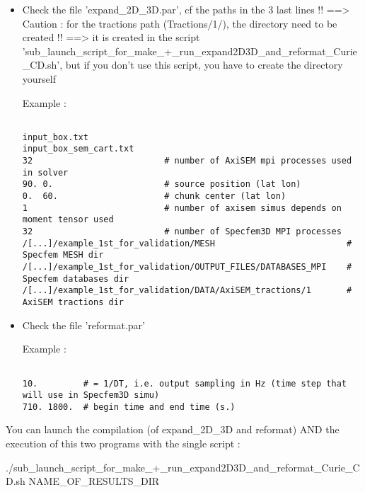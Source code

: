 \documentclass[11pt]{article}
\begin{document}
\begin{itemize}

\item[\textbullet] Check the file 'expand\_2D\_3D.par', cf the paths in the 3 last lines !! ==> Caution : for the tractions path (Tractions/1/), the directory need to be created !! ==> it is created in the script 'sub\_launch\_script\_for\_make\_+\_run\_expand2D3D\_and\_reformat\_Curie\_CD.sh', but if you don't use this script, you have to create the directory yourself

\smallskip

\noindent Example :
\begin{verbatim}

input_box.txt
input_box_sem_cart.txt
32                          # number of AxiSEM mpi processes used in solver
90. 0.                      # source position (lat lon)
0.  60.                     # chunk center (lat lon)
1                           # number of axisem simus depends on moment tensor used
32                          # number of Specfem3D MPI processes
/[...]/example_1st_for_validation/MESH                          # Specfem MESH dir
/[...]/example_1st_for_validation/OUTPUT_FILES/DATABASES_MPI    # Specfem databases dir
/[...]/example_1st_for_validation/DATA/AxiSEM_tractions/1       # AxiSEM tractions dir

\end{verbatim}

\item[\textbullet] Check the file 'reformat.par'

\smallskip

\noindent Example :
\begin{verbatim}

10.         # = 1/DT, i.e. output sampling in Hz (time step that will use in Specfem3D simu)
710. 1800.  # begin time and end time (s.)

\end{verbatim}

\end{itemize}

\medskip

\noindent You can launch the compilation (of expand\_2D\_3D and reformat) AND the execution of this two programs with the single script :

\smallskip

\noindent ./sub\_launch\_script\_for\_make\_+\_run\_expand2D3D\_and\_reformat\_Curie\_CD.sh NAME\_OF\_RESULTS\_DIR

\medskip
\end{document}
